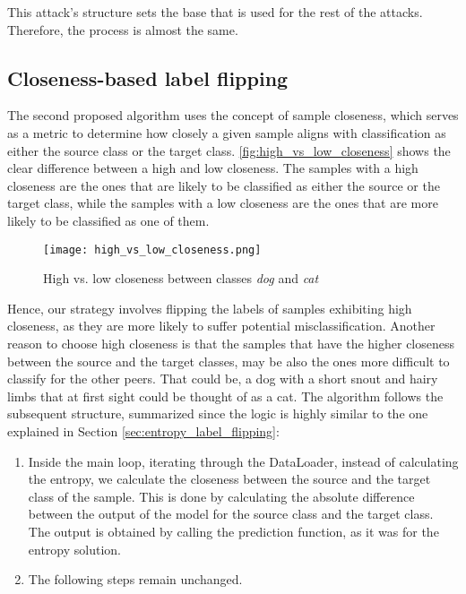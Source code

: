 This attack's structure sets the base that is used for the rest of the attacks. Therefore, the process is almost the same.

\subsection{Closeness-based label flipping}\label{sec:closeness_label_flipping}
The second proposed algorithm uses the concept of sample closeness, which serves as a metric to determine how closely a given sample aligns with classification as either the source class or the target class. \autoref{fig:high_vs_low_closeness} shows the clear difference between a high and low closeness. The samples with a high closeness are the ones that are likely to be classified as either the source or the target class, while the samples with a low closeness are the ones that are more likely to be classified as one of them.

\begin{figure}[h!]
        \centering
        \texttt{[image: high\_vs\_low\_closeness.png]}
        \caption{High vs. low closeness between classes \textit{dog} and \textit{cat}}
        \label{fig:high_vs_low_closeness}
\end{figure}

Hence, our strategy involves flipping the labels of samples exhibiting high closeness, as they are more likely to suffer potential misclassification. Another reason to choose high closeness is that the samples that have the higher closeness between the source and the target classes, may be also the ones more difficult to classify for the other peers. That could be, a dog with a short snout and hairy limbs that at first sight could be thought of as a cat.
The algorithm follows the subsequent structure, summarized since the logic is highly similar to the one explained in Section \ref{sec:entropy_label_flipping}:%
\begin{enumerate}
        \item Inside the main loop, iterating through the DataLoader, instead of calculating the entropy, we calculate the closeness between the source and the target class of the sample. This is done by calculating the absolute difference between the output of the model for the source class and the target class. The output is obtained by calling the prediction function, as it was for the entropy solution.
        \item The following steps remain unchanged.
\end{enumerate}






